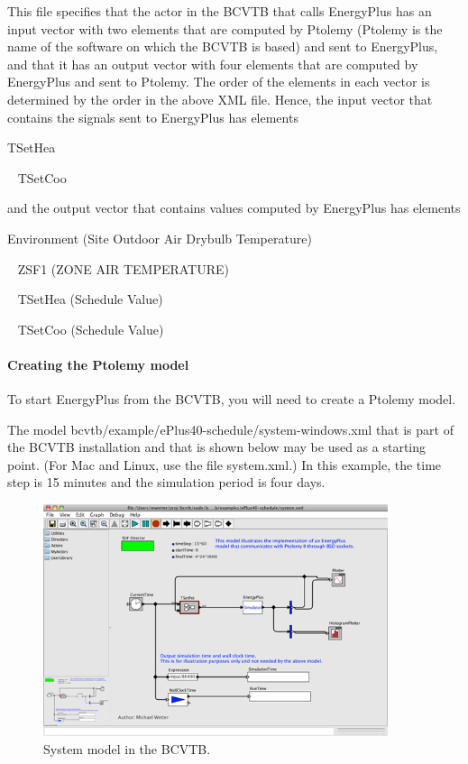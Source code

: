 This file specifies that the actor in the BCVTB that calls EnergyPlus has an input vector with two elements that are computed by Ptolemy (Ptolemy is the name of the software on which the BCVTB is based) and sent to EnergyPlus, and that it has an output vector with four elements that are computed by EnergyPlus and sent to Ptolemy. The order of the elements in each vector is determined by the order in the above XML file. Hence, the input vector that contains the signals sent to EnergyPlus has elements

TSetHea

~ TSetCoo

and the output vector that contains values computed by EnergyPlus has elements

Environment (Site Outdoor Air Drybulb Temperature)

~ ZSF1 (ZONE AIR TEMPERATURE)

~ TSetHea (Schedule Value)

~ TSetCoo (Schedule Value)

\paragraph{\texorpdfstring{\textbf{Creating the Ptolemy model}}{Creating the Ptolemy model}}\label{creating-the-ptolemy-model}

To start EnergyPlus from the BCVTB, you will need to create a Ptolemy model.

The model bcvtb/example/ePlus40-schedule/system-windows.xml that is part of the BCVTB installation and that is shown below may be used as a starting point. (For Mac and Linux, use the file system.xml.) In this example, the time step is 15 minutes and the simulation period is four days.

\begin{figure}[hbtp] %
\centering
\includegraphics[width=0.9\textwidth, height=0.9\textheight, keepaspectratio=true]{media/image005.png}
\caption{System model in the BCVTB. \protect \label{fig:system-model-in-the-bcvtb.}}
\end{figure}


